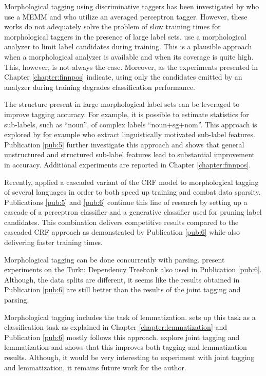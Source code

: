 Morphological tagging using discriminative taggers has been
investigated by \cite{Chrupala2008} who use a MEMM and
\cite{Spoustova2009} who utilize an averaged perceptron
tagger. However, these works do not adequately solve the problem of
slow training times for morphological taggers in the presence of large
label sets. \cite{Spoustova2009} use a morphological analyzer to limit
label candidates during training. This is a plausible approach when a
morphological analyzer is available and when its coverage is quite
high. This, however, is not always the case. Moreover, as the
experiments presented in Chapter \ref{chapter:finnpos} indicate, using
only the candidates emitted by an analyzer during training degrades
classification performance.

The structure present in large morphological label sets can be
leveraged to improve tagging accuracy. For example, it is possible to
estimate statistics for sub-labels, such as ``noun'', of complex
labels ``noun+sg+nom''. This approach is explored by for example
\cite{Spoustova2009} who extract linguistically motivated sub-label
features. Publication \ref{pub:5} further investigate this approach and
shows that general unstructured and structured sub-label features lead
to substantial improvement in accuracy. Additional experiments are
reported in Chapter \ref{chapter:finnpos}.

Recently, \cite{Muller2013} applied a cascaded variant of the CRF
model to morphological tagging of several languages in order to both
speed up training and combat data sparsity. Publications \ref{pub:5} and
\ref{pub:6} continue this line of research by setting up a
cascade of a perceptron classifier and a generative classifier used
for pruning label candidates. This combination delivers competitive
results compared to the cascaded CRF approach as demonstrated by
Publication \ref{pub:6} while also delivering faster training times.

Morphological tagging can be done concurrently with parsing.
\cite{Bohnet2013} present experiments on the Turku Dependency Treebank
also used in Publication \ref{pub:6}. Although, the data splits are
different, it seems like the results obtained in
Publication \ref{pub:6} are still better than the results of the joint
tagging and parsing.

Morphological tagging includes the task of
lemmatization. \cite{Chrupala2008} sets up this task as a
classification task as explained in Chapter
\ref{chapter:lemmatization} and Publication \ref{pub:6} mostly follows
this approach. \cite{Muller2015} explore joint tagging and
lemmatization and shows that this improves both tagging and
lemmatization results. Although, it would be very interesting to
experiment with joint tagging and lemmatization, it remains future
work for the author. 

